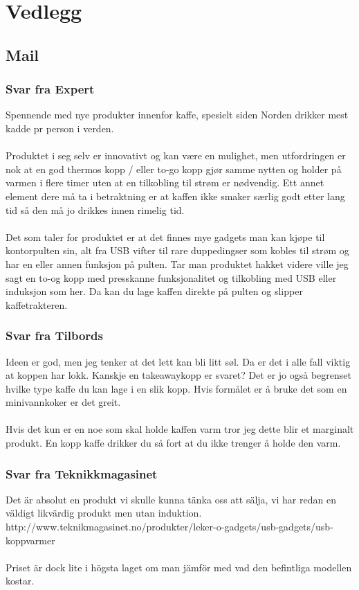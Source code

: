 \chapter{Vedlegg}

\section{Mail}

\subsection{Svar fra Expert}
Spennende med nye produkter innenfor kaffe, spesielt siden Norden drikker mest kadde pr person i verden.
\\
\\
Produktet i seg selv er innovativt og kan være en mulighet, men utfordringen er nok at en god thermos kopp / eller to-go kopp gjør samme nytten og holder på varmen i flere timer uten at en tilkobling til strøm er nødvendig. Ett annet element dere må ta i betraktning er at kaffen ikke smaker særlig godt etter lang tid så den må jo drikkes innen rimelig tid.
\\
\\
Det som taler for produktet er at det finnes mye gadgets man kan kjøpe til kontorpulten sin, alt fra USB vifter til rare duppedingser som kobles til strøm og har en eller annen funksjon på pulten.
Tar man produktet hakket videre ville jeg sagt en to-og kopp med presskanne funksjonalitet og tilkobling med USB eller induksjon som her. Da kan du lage kaffen direkte på pulten og slipper kaffetrakteren.

\subsection{Svar fra Tilbords}
Ideen er god, men jeg tenker at det lett kan bli litt søl.  Da er det i alle fall viktig at koppen har lokk.  Kanskje en takeawaykopp er svaret?  Det er jo også begrenset hvilke type kaffe du kan lage i en slik kopp.  Hvis formålet er å bruke det som en minivannkoker er det greit.
\\
\\ 
Hvis det kun er en noe som skal holde kaffen varm tror jeg dette blir et marginalt produkt.  En kopp kaffe drikker du så fort at du ikke trenger å holde den varm. 

\subsection{Svar fra Teknikkmagasinet}
Det är absolut en produkt vi skulle kunna tänka oss att sälja, vi har redan en väldigt likvärdig produkt men utan induktion.
http://www.teknikmagasinet.no/produkter/leker-o-gadgets/usb-gadgets/usb-koppvarmer
\\
\\
Priset är dock lite i högsta laget om man jämför med vad den befintliga modellen kostar.

